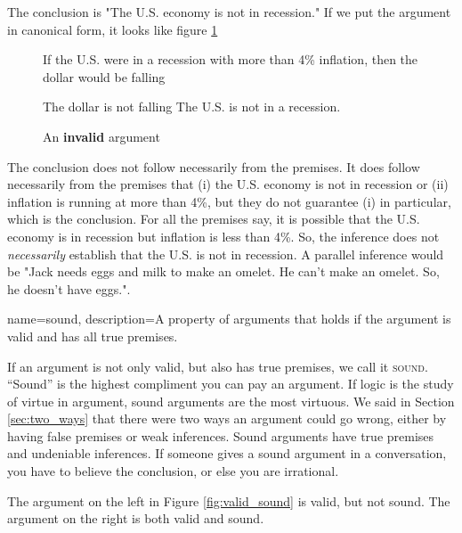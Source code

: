 The conclusion is "The U.S. economy is not in recession." If we put the argument in canonical form, it looks like figure \ref{fig:invalid_recession}

\begin{figure}
\begin{mdframed}[style=mytablebox]
\begin{earg*}
\item If the U.S. were in a recession with more than 4\% inflation, then the dollar would be falling
\item The dollar is not falling
\itemc[.3] The U.S. is not in a recession. 
\end{earg*}
\end{mdframed}
\caption{An \textbf{invalid} argument} \label{fig:invalid_recession}
\end{figure}

The conclusion does not follow necessarily from the premises. It does follow necessarily from the premises that (i) the U.S. economy is not in recession or (ii) inflation is running at more than 4\%, but they do not guarantee (i) in particular, which is the conclusion. For all the premises say, it is possible that the U.S. economy is in recession but inflation is less than 4\%. So, the inference does not \textit{necessarily} establish that the U.S. is not in recession. A parallel inference would be "Jack needs eggs and milk to make an omelet. He can't make an omelet. So, he doesn't have eggs.". 

{
name=sound,
description={A property of arguments that holds if the argument is valid and has all true premises.}
}

If an argument is not only valid, but also has true premises, we call it \textsc{\gls{sound}}. \label{def:sound} ``Sound'' is the highest compliment you can pay an argument. If logic is the study of virtue in argument, sound arguments are the most virtuous. We said in Section \ref{sec:two_ways} that there were two ways an argument could go wrong, either by having false premises or weak inferences. Sound arguments have true premises and undeniable inferences. If someone gives a sound argument in a conversation, you have to believe the conclusion, or else you are irrational.  

The argument on the left in Figure \ref{fig:valid_sound} is valid, but not sound. The argument on the right is both valid and sound.


